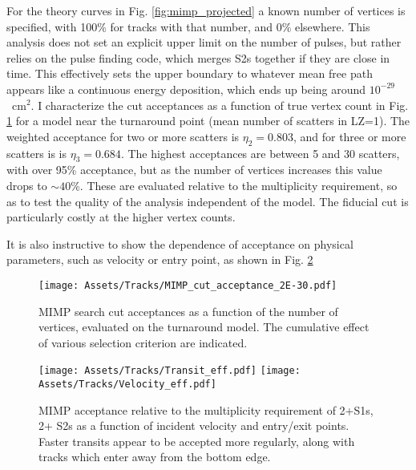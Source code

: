 For the theory curves in Fig. \ref{fig:mimp_projected} a known number of vertices is specified, with 100\% for tracks with that number, and 0\% elsewhere.
This analysis does not set an explicit upper limit on the number of pulses, but rather relies on the pulse finding code, which merges S2s together if they are close in time.
This effectively sets the upper boundary to whatever mean free path appears like a continuous energy deposition, which ends up being around $10^{-29}$~cm$^2$.
I characterize the cut acceptances as a function of true vertex count in Fig. \ref{fig:mimp_cut_acceptance} for a model near the turnaround point (mean number of scatters in LZ=1).
The weighted acceptance for two or more scatters is $\eta_2 =0.803$, and for three or more scatters is is $\eta_3=0.684$.
The highest acceptances are between 5 and 30 scatters, with over 95\% acceptance, but as the number of vertices increases this value drops to $\sim 40$\%.
These are evaluated relative to the multiplicity requirement, so as to test the quality of the analysis independent of the model.
The fiducial cut is particularly costly at the higher vertex counts.

It is also instructive to show the dependence of acceptance on physical parameters, such as velocity or entry point, as shown in Fig. \ref{fig:mimp_locations}
\begin{figure}
    \centering
    \texttt{[image: Assets/Tracks/MIMP\_cut\_acceptance\_2E-30.pdf]}
    \caption[MIMP search cut acceptances as a function of the number of vertices, evaluated on the turnaround model. ]%
    {MIMP search cut acceptances as a function of the number of vertices, evaluated on the turnaround model. 
    The cumulative effect of various selection criterion are indicated.}
    \label{fig:mimp_cut_acceptance}
\end{figure}
\begin{figure}
    \centering
        \texttt{[image: Assets/Tracks/Transit\_eff.pdf]}
    \texttt{[image: Assets/Tracks/Velocity\_eff.pdf]}
    \caption[MIMP acceptance relative to the multiplicity requirement of 2+S1s, 2+ S2s as a function of incident velocity and entry/exit points.]%
    {MIMP acceptance relative to the multiplicity requirement of 2+S1s, 2+ S2s as a function of incident velocity and entry/exit points.
    Faster transits appear to be accepted more regularly, along with tracks which enter away from the bottom edge.}
    \label{fig:mimp_locations}
\end{figure}

